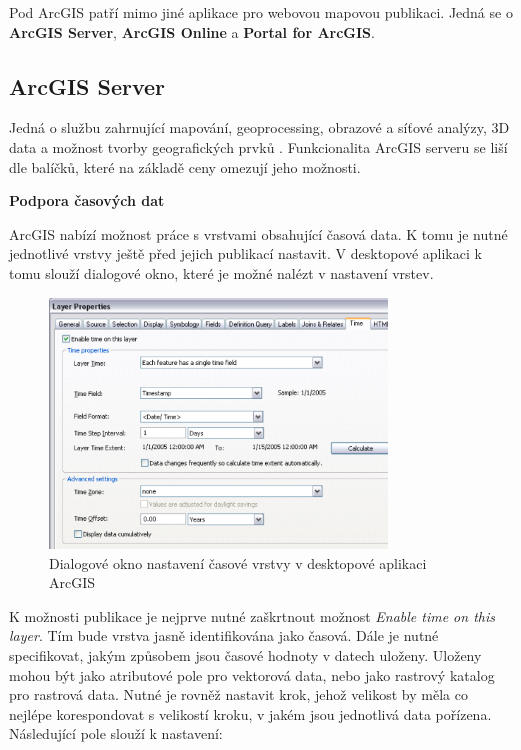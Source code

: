 Pod ArcGIS patří mimo jiné aplikace pro webovou mapovou
publikaci. Jedná se o \textbf{ArcGIS Server}, \textbf{ArcGIS Online} a
\textbf{Portal for ArcGIS}.

\newpage
\subsection{ArcGIS Server}

Jedná o službu zahrnující mapování, geoprocessing, obrazové a síťové
analýzy, 3D data a možnost tvorby geografických prvků
\cite{arcgis-publishing-service}. Funkcionalita ArcGIS serveru se liší
dle balíčků, které na základě ceny omezují jeho možnosti.

\bigskip
\noindent \textbf{Podpora časových dat}
 
ArcGIS nabízí možnost práce s vrstvami obsahující časová data. K
tomu je nutné jednotlivé vrstvy ještě před jejich publikací
nastavit. V desktopové aplikaci k tomu slouží dialogové okno, které je
možné nalézt v nastavení vrstev.

\begin{figure}[h!]  \centering
\includegraphics[width=0.8\textwidth]{../img/arcgis-layer-edit.png}
	\caption{Dialogové okno nastavení časové vrstvy v desktopové
aplikaci ArcGIS}
	\label{fig:arcgis-time-settings}
\end{figure}

K možnosti publikace je nejprve nutné zaškrtnout možnost \textit{Enable time
on this layer}. Tím bude vrstva jasně identifikována jako časová. Dále
je nutné specifikovat, jakým způsobem jsou časové hodnoty v datech
uloženy. Uloženy mohou být jako atributové pole pro vektorová data, nebo
jako rastrový katalog pro rastrová data. Nutné je rovněž nastavit
krok, jehož velikost by měla co nejlépe korespondovat s velikostí kroku, 
v jakém jsou jednotlivá data pořízena. Následující pole slouží k nastavení:

